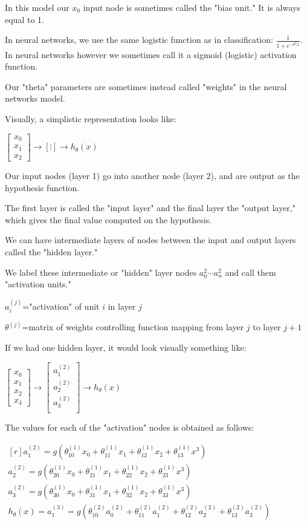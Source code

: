 \documentclass{article}
\begin{document}
In this model our $x_0$ input node is sometimes called the "bias unit." It is always equal to 1.

In neural networks, we use the same logistic function as in classification: $\frac{1}{1+e^{−\theta^Tx}}$. In neural networks however we sometimes call it a sigmoid (logistic) activation function.

Our "theta" parameters are sometimes instead called "weights" in the neural networks model.

Visually, a simplistic representation looks like:

$\left[\begin{matrix}
x_0 \\
x_1 \\
x_2
\end{matrix}\right]\to\left[\vdots \right]\to h_{\theta}(x)
$

Our input nodes (layer 1) go into another node (layer 2), and are output as the hypothesis function.

The first layer is called the "input layer" and the final layer the "output layer," which gives the final value computed on the hypothesis.

We can have intermediate layers of nodes between the input and output layers called the "hidden layer."

We label these intermediate or "hidden" layer nodes $a_0^2 \cdots a_n^2$ and call them "activation units."

$a_i^{(j)}$="activation" of unit $i$ in layer $j$

$\theta^{(j)}$=matrix of weights controlling function mapping from layer $j$ to layer $j+1$

If we had one hidden layer, it would look visually something like:


$\left[\begin{matrix}
x_0 \\
x_1 \\
x_2 \\
x_4
\end{matrix}\right]\to\left[
\begin{matrix}
a_1^{(2)} \\
a_2^{(2)} \\
a_3^{(2)} \\
\end{matrix}
 \right]\to h_{\theta}(x)
$


The values for each of the "activation" nodes is obtained as follows:

$
\begin{matrix*}[r]

a_1^{(2)}=g(\theta_{10}^{(1)}x_0+\theta_{11}^{(1)}x_1+\theta_{12}^{(1)}x_2+\theta_{13}^{(1)}x^3) \\
a_2^{(2)}=g(\theta_{20}^{(1)}x_0+\theta_{21}^{(1)}x_1+\theta_{22}^{(1)}x_2+\theta_{23}^{(1)}x^3) \\
a_3^{(2)}=g(\theta_{30}^{(1)}x_0+\theta_{31}^{(1)}x_1+\theta_{32}^{(1)}x_2+\theta_{33}^{(1)}x^3) \\
h_{\theta}(x)=a_1^{(3)}=g(\theta_{10}^{(2)}a_0^{(2)}+\theta_{11}^{(2)}a_1^{(2)}+\theta_{12}^{(2)}a_2^{(2)}+\theta_{13}^{(2)}a_3^{(2)})
\end{matrix*}
$
\end{document}
